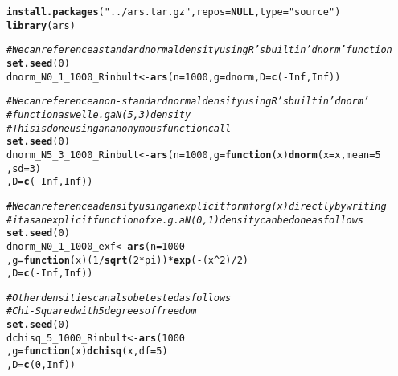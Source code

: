 \documentclass{article}\usepackage[]{graphicx}\usepackage[]{color}
\makeatletter
\newcommand{\hlnum}[1]{\textcolor[rgb]{0.686,0.059,0.569}{#1}}%
\newcommand{\hlstr}[1]{\textcolor[rgb]{0.192,0.494,0.8}{#1}}%
\newcommand{\hlcom}[1]{\textcolor[rgb]{0.678,0.584,0.686}{\textit{#1}}}%
\newcommand{\hlopt}[1]{\textcolor[rgb]{0,0,0}{#1}}%
\newcommand{\hlstd}[1]{\textcolor[rgb]{0.345,0.345,0.345}{#1}}%
\newcommand{\hlkwa}[1]{\textcolor[rgb]{0.161,0.373,0.58}{\textbf{#1}}}%
\newcommand{\hlkwb}[1]{\textcolor[rgb]{0.69,0.353,0.396}{#1}}%
\newcommand{\hlkwc}[1]{\textcolor[rgb]{0.333,0.667,0.333}{#1}}%
\newcommand{\hlkwd}[1]{\textcolor[rgb]{0.737,0.353,0.396}{\textbf{#1}}}%
\newenvironment{kframe}{%
 \def\at@end@of@kframe{}%
 \ifinner\ifhmode%
  \def\at@end@of@kframe{\end{minipage}}%
  \begin{minipage}{\columnwidth}%
 \fi\fi%
 \def\FrameCommand##1{\hskip\@totalleftmargin \hskip-\fboxsep
 \colorbox{shadecolor}{##1}\hskip-\fboxsep
     \hskip-\linewidth \hskip-\@totalleftmargin \hskip\columnwidth}%
 \MakeFramed {\advance\hsize-\width
   \@totalleftmargin\z@ \linewidth\hsize
   \@setminipage}}%
 {\par\unskip\endMakeFramed%
 \at@end@of@kframe}
\newenvironment{knitrout}{}{} %
\makeatother
\begin{document}
\begin{knitrout}
\color{fgcolor}\begin{kframe}
\begin{alltt}
 \hlkwd{install.packages}\hlstd{(}\hlstr{"../ars.tar.gz"}\hlstd{,} \hlkwc{repos}\hlstd{=}\hlkwa{NULL}\hlstd{,} \hlkwc{type}\hlstd{=}\hlstr{"source"}\hlstd{)}
 \hlkwd{library}\hlstd{(ars)}

 \hlcom{# We can reference a standard normal density using R's built in 'dnorm' function}
 \hlkwd{set.seed}\hlstd{(}\hlnum{0}\hlstd{)}
 \hlstd{dnorm_N0_1_1000_Rinbult} \hlkwb{<-} \hlkwd{ars}\hlstd{(}\hlkwc{n} \hlstd{=} \hlnum{1000}\hlstd{,} \hlkwc{g} \hlstd{= dnorm,} \hlkwc{D} \hlstd{=} \hlkwd{c}\hlstd{(}\hlopt{-}\hlnum{Inf}\hlstd{,}\hlnum{Inf}\hlstd{))}

 \hlcom{# We can reference a non-standard normal density using R's built in 'dnorm' }
 \hlcom{# function as well e.g a N(5, 3) density}
 \hlcom{# This is done using an anonymous function call}
 \hlkwd{set.seed}\hlstd{(}\hlnum{0}\hlstd{)}
 \hlstd{dnorm_N5_3_1000_Rinbult} \hlkwb{<-} \hlkwd{ars}\hlstd{(}\hlkwc{n} \hlstd{=} \hlnum{1000}\hlstd{,} \hlkwc{g} \hlstd{=} \hlkwa{function}\hlstd{(}\hlkwc{x}\hlstd{)} \hlkwd{dnorm}\hlstd{(}\hlkwc{x} \hlstd{= x,} \hlkwc{mean} \hlstd{=} \hlnum{5}
                                                               \hlstd{,} \hlkwc{sd} \hlstd{=} \hlnum{3}\hlstd{)}
                               \hlstd{,} \hlkwc{D} \hlstd{=} \hlkwd{c}\hlstd{(}\hlopt{-}\hlnum{Inf}\hlstd{,}\hlnum{Inf}\hlstd{))}

 \hlcom{# We can reference a density using an explicit form for g(x) directly by writing }
 \hlcom{# it as an explicit function of x e.g. a N(0, 1) density can be done as follows}
 \hlkwd{set.seed}\hlstd{(}\hlnum{0}\hlstd{)}
 \hlstd{dnorm_N0_1_1000_exf} \hlkwb{<-} \hlkwd{ars}\hlstd{(}\hlkwc{n} \hlstd{=} \hlnum{1000}
                             \hlstd{,} \hlkwc{g} \hlstd{=} \hlkwa{function}\hlstd{(}\hlkwc{x}\hlstd{) (}\hlnum{1}\hlopt{/}\hlkwd{sqrt}\hlstd{(}\hlnum{2}\hlopt{*}\hlstd{pi))}\hlopt{*}\hlkwd{exp}\hlstd{(}\hlopt{-}\hlstd{(x}\hlopt{^}\hlnum{2}\hlstd{)}\hlopt{/}\hlnum{2}\hlstd{)}
                             \hlstd{,} \hlkwc{D} \hlstd{=} \hlkwd{c}\hlstd{(}\hlopt{-}\hlnum{Inf}\hlstd{,}\hlnum{Inf}\hlstd{))}

 \hlcom{# Other densities can also be tested as follows}
 \hlcom{# Chi-Squared with 5 degrees of freedom}
 \hlkwd{set.seed}\hlstd{(}\hlnum{0}\hlstd{)}
 \hlstd{dchisq_5_1000_Rinbult} \hlkwb{<-} \hlkwd{ars}\hlstd{(}\hlnum{1000}
                              \hlstd{,} \hlkwc{g} \hlstd{=} \hlkwa{function}\hlstd{(}\hlkwc{x}\hlstd{)} \hlkwd{dchisq}\hlstd{(x,} \hlkwc{df} \hlstd{=} \hlnum{5}\hlstd{)}
                              \hlstd{,} \hlkwc{D} \hlstd{=} \hlkwd{c}\hlstd{(}\hlnum{0}\hlstd{,} \hlnum{Inf}\hlstd{))}


\end{alltt}
\end{kframe}
\end{knitrout}
\end{document}

